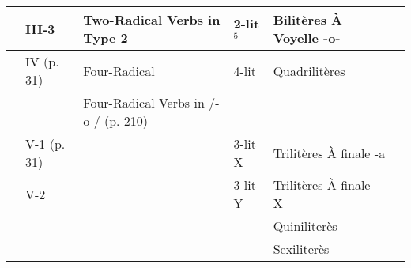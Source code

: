 \begin{tabular}{|l|l|l|l|l|l|}
        & III-3            & Two-Radical Verbs in Type 2            & 2-lit$^5$         & Bilit\`{e}res \`{A} Voyelle -o-      & \\ \hline
        & IV      (p. 31)  & Four-Radical                           & 4-lit             & Quadrilit\`{e}res                    & \\ \hline
        &                  & Four-Radical Verbs in /-o-/ (p. 210)  &                    &                                      & \\ \hline
        & V-1     (p. 31)  &                                        & 3-lit X           & Trilit\`{e}res \`{A} finale -a       & \\ \hline
        & V-2              &                                        & 3-lit Y           & Trilit\`{e}res \`{A} finale -X       & \\ \hline
        &                  &                                        &                   & Quiniliter\`{e}s                     & \\ \hline
        &                  &                                        &                   & Sexiliter\`{e}s                      & \\ \hline 
\end{tabular} \\













